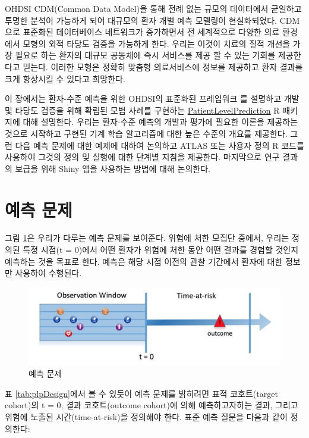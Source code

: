 \documentclass[11pt]{book}
\theoremstyle{definition}
\theoremstyle{definition}
\theoremstyle{definition}
\theoremstyle{remark}
\begin{document}
OHDSI CDM(Common Data Model)을 통해 전례 없는 규모의 데이터에서 균일하고
투명한 분석이 가능하게 되어 대규모의 환자 개별 예측 모델링이
현실화되었다. CDM으로 표준화된 데이터베이스 네트워크가 증가하면서 전
세계적으로 다양한 의료 환경에서 모형의 외적 타당도 검증을 가능하게 한다.
우리는 이것이 치료의 질적 개선을 가장 필요로 하는 환자의 대규모 공동체에
즉시 서비스를 제공 할 수 있는 기회를 제공한다고 믿는다. 이러한 모형은
정확히 맞춤형 의료서비스에 정보를 제공하고 환자 결과를 크게 향상시킬 수
있다고 희망한다.

이 장에서는 환자-수준 예측을 위한 OHDSI의 표준화된 프레임워크
\citep{reps2018}를 설명하고 개발 및 타당도 검증을 위해 확립된 모범
사례를 구현하는
\href{https://ohdsi.github.io/PatientLevelPrediction/}{PatientLevelPrediction}
R 패키지에 대해 설명한다. 우리는 환자-수준 예측의 개발과 평가에 필요한
이론을 제공하는 것으로 시작하고 구현된 기계 학습 알고리즘에 대한 높은
수준의 개요를 제공한다. 그런 다음 예측 문제에 대한 예제에 대하여
논의하고 ATLAS 또는 사용자 정의 R 코드를 사용하여 그것의 정의 및 실행에
대한 단계별 지침을 제공한다. 마지막으로 연구 결과의 보급을 위해 Shiny
앱을 사용하는 방법에 대해 논의한다.

\section{예측 문제}\label{-}

그림 \ref{fig:figure1}은 우리가 다루는 예측 문제를 보여준다. 위험에 처한
모집단 중에서, 우리는 정의된 특정 시점(t = 0)에서 어떤 환자가 위험에
처한 동안 어떤 결과를 경험할 것인지 예측하는 것을 목표로 한다. 예측은
해당 시점 이전의 관찰 기간에서 환자에 대한 정보만 사용하여 수행된다.

\begin{figure}

{\centering \includegraphics[width=1\linewidth]{images/PatientLevelPrediction/Figure1} 

}

\caption{예측 문제}\label{fig:figure1}
\end{figure}

표 \ref{tab:plpDesign}에서 볼 수 있듯이 예측 문제를 밝히려면 표적
코호트(target cohort)의 t = 0, 결과 코호트(outcome cohort)에 의해
예측하고자하는 결과, 그리고 위험에 노출된 시간(time-at-risk)을 정의해야
한다. 표준 예측 질문을 다음과 같이 정의한다: 
 
\end{document}

